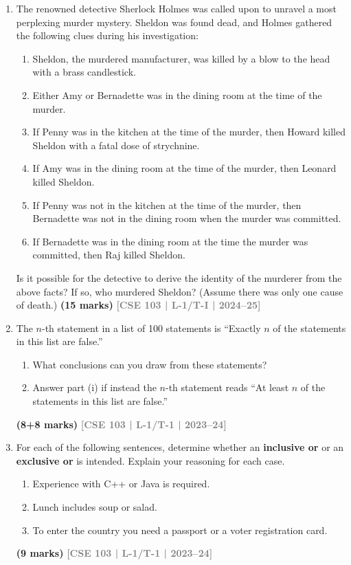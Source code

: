 \documentclass[12pt,a3paper]{article}
\newcommand{\yr}[1]{\hfill\textcolor{gray}{\small\textbf{[#1]}}}
\newcommand{\mk}[1]{\textcolor{orange!70!black}{\small\textbf{(#1 marks)}}}
\begin{document}
\begin{enumerate}
  

\item The renowned detective Sherlock Holmes was called upon to unravel a most perplexing murder mystery. Sheldon was found dead, and Holmes gathered the following clues during his investigation:
\begin{enumerate}
    \item Sheldon, the murdered manufacturer, was killed by a blow to the head with a brass candlestick.
    \item Either Amy or Bernadette was in the dining room at the time of the murder.
    \item If Penny was in the kitchen at the time of the murder, then Howard killed Sheldon with a fatal dose of strychnine.
    \item If Amy was in the dining room at the time of the murder, then Leonard killed Sheldon.
    \item If Penny was not in the kitchen at the time of the murder, then Bernadette was not in the dining room when the murder was committed.
    \item If Bernadette was in the dining room at the time the murder was committed, then Raj killed Sheldon.
\end{enumerate}
Is it possible for the detective to derive the identity of the murderer from the above facts? If so, who murdered Sheldon? (Assume there was only one cause of death.)
\mk{15} \yr{CSE 103 | L-1/T-I | 2024--25}

\item The $n$-th statement in a list of 100 statements is ``Exactly $n$ of the statements in this list are false.''
\begin{enumerate}
  \item What conclusions can you draw from these statements?
  \item Answer part (i) if instead the $n$-th statement reads ``At least $n$ of the statements in this list are false.''
\end{enumerate}
\mk{8+8} \yr{CSE 103 | L-1/T-1 | 2023--24}

\item For each of the following sentences, determine whether an \textbf{inclusive or} or an \textbf{exclusive or} is intended. Explain your reasoning for each case.
\begin{enumerate}
  \item Experience with C++ or Java is required.
  \item Lunch includes soup or salad.
  \item To enter the country you need a passport or a voter registration card.
\end{enumerate}
\mk{9} \yr{CSE 103 | L-1/T-1 | 2023--24}


\end{enumerate}
\end{document}
